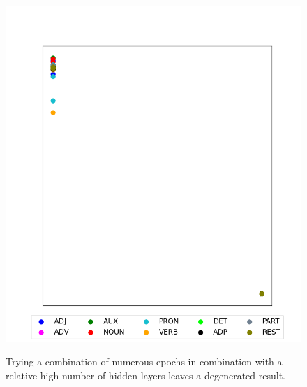\begin{figure}[H]
{		\includegraphics[height=\twocolpicheight]{Bilder/chapter4/additional_configurations/W2V_W2V_25000E_100BS_40L_1C_200P_1500T_J/MDS_of_Transition_Probability_Matrix;_t=1,_DF=0.5.png}
	}
	\caption{Trying a combination of numerous epochs in combination with a relative high number of hidden layers leaves a degenerated result.}
\end{figure}


\clearpage
